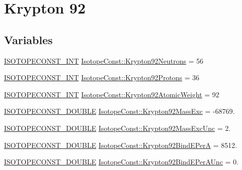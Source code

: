 \hypertarget{group___isotope_const-_krypton-_kr92}{}\section{Krypton 92}
\label{group___isotope_const-_krypton-_kr92}
\subsection*{Variables}
\begin{DoxyCompactItemize}
\item 
\mbox{\hyperlink{group___isotope_const-_macros_ga5f18360b3e99483a35c32d789e62621c}{I\+S\+O\+T\+O\+P\+E\+C\+O\+N\+S\+T\+\_\+\+I\+NT}} \mbox{\hyperlink{group___isotope_const-_krypton-_kr92_gab74dfee12c23f26949ea2473b48623d1}{Isotope\+Const\+::\+Krypton92\+Neutrons}} = 56
\item 
\mbox{\hyperlink{group___isotope_const-_macros_ga5f18360b3e99483a35c32d789e62621c}{I\+S\+O\+T\+O\+P\+E\+C\+O\+N\+S\+T\+\_\+\+I\+NT}} \mbox{\hyperlink{group___isotope_const-_krypton-_kr92_gac76b95e05fe58754a3c5f3fd30fd30dd}{Isotope\+Const\+::\+Krypton92\+Protons}} = 36
\item 
\mbox{\hyperlink{group___isotope_const-_macros_ga5f18360b3e99483a35c32d789e62621c}{I\+S\+O\+T\+O\+P\+E\+C\+O\+N\+S\+T\+\_\+\+I\+NT}} \mbox{\hyperlink{group___isotope_const-_krypton-_kr92_ga316f066fca52fdb4dbb0df15f0200b07}{Isotope\+Const\+::\+Krypton92\+Atomic\+Weight}} = 92
\item 
\mbox{\hyperlink{group___isotope_const-_macros_ga8f45a7272ce02c0b4c65c44636ed719a}{I\+S\+O\+T\+O\+P\+E\+C\+O\+N\+S\+T\+\_\+\+D\+O\+U\+B\+LE}} \mbox{\hyperlink{group___isotope_const-_krypton-_kr92_gaae7adbf54a305d4a907a78a61fd42588}{Isotope\+Const\+::\+Krypton92\+Mass\+Exc}} = -\/68769.
\item 
\mbox{\hyperlink{group___isotope_const-_macros_ga8f45a7272ce02c0b4c65c44636ed719a}{I\+S\+O\+T\+O\+P\+E\+C\+O\+N\+S\+T\+\_\+\+D\+O\+U\+B\+LE}} \mbox{\hyperlink{group___isotope_const-_krypton-_kr92_gafae0eee4898a228aa15b45a118b1ce51}{Isotope\+Const\+::\+Krypton92\+Mass\+Exc\+Unc}} = 2.
\item 
\mbox{\hyperlink{group___isotope_const-_macros_ga8f45a7272ce02c0b4c65c44636ed719a}{I\+S\+O\+T\+O\+P\+E\+C\+O\+N\+S\+T\+\_\+\+D\+O\+U\+B\+LE}} \mbox{\hyperlink{group___isotope_const-_krypton-_kr92_ga25223e629a3279fbef6d118839b15867}{Isotope\+Const\+::\+Krypton92\+Bind\+E\+PerA}} = 8512.
\item 
\mbox{\hyperlink{group___isotope_const-_macros_ga8f45a7272ce02c0b4c65c44636ed719a}{I\+S\+O\+T\+O\+P\+E\+C\+O\+N\+S\+T\+\_\+\+D\+O\+U\+B\+LE}} \mbox{\hyperlink{group___isotope_const-_krypton-_kr92_ga7632efdf4d8cbb4208303e9e49834139}{Isotope\+Const\+::\+Krypton92\+Bind\+E\+Per\+A\+Unc}} = 0.

\end{DoxyCompactItemize}
